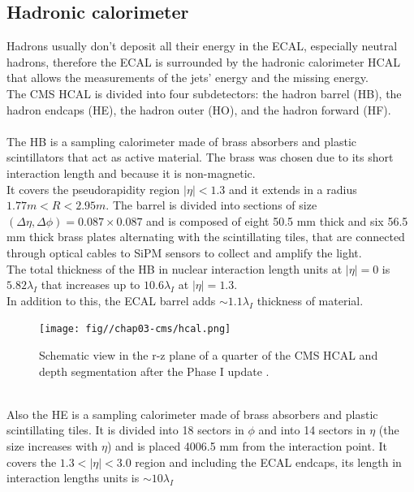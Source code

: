 \subsection{Hadronic calorimeter}
Hadrons usually don't deposit all their energy in the ECAL, especially neutral hadrons, therefore the ECAL is surrounded by the hadronic calorimeter HCAL that allows the measurements of the jets' energy and the missing energy.\\
The CMS HCAL \cite{Green1997TheReport,Anderson2012CMSCalorimeter} is divided into four subdetectors: the hadron barrel (HB), the hadron endcaps (HE), the hadron outer (HO), and the hadron forward (HF).\\
\\
The HB is a sampling calorimeter made of brass absorbers and plastic scintillators that act as active material. The brass was chosen due to its short interaction length and because it is non-magnetic.\\
It covers the pseudorapidity  region $|\eta|<1.3$ and it extends in a radius $1.77m<R<2.95m$. The barrel is divided into sections of size $(\Delta \eta, \Delta \phi)=0.087 \times 0.087$ and is composed of eight 50.5 mm thick and six 56.5 mm thick brass plates alternating with the scintillating tiles, that are connected through optical cables to SiPM sensors to collect and amplify the light.\\
The total thickness of the HB in nuclear interaction length units at $|\eta|=0$ is $5.82 \lambda_I$ that increases up to $10.6\lambda_I$ at $|\eta|=1.3$.\\
In addition to this, the ECAL barrel adds $\sim 1.1\lambda_I$ thickness of material.\\
\begin{figure}[h!]
    \centering
    \texttt{[image: fig//chap03-cms/hcal.png]}
    \caption{Schematic view in the r-z plane of a quarter of the CMS HCAL and depth segmentation after the Phase I update \cite{Anderson2012CMSCalorimeter}. }
    \label{fig:hcal}
\end{figure}
\\
Also the HE is a sampling calorimeter made of brass absorbers and plastic scintillating tiles. It is divided into 18 sectors in $\phi$ and into 14 sectors in $\eta$ (the size increases with $\eta$) and is placed 4006.5 mm from the interaction point. It covers the $1.3 < |\eta|<3.0$ region and including the ECAL endcaps, its length in interaction lengths units is $\sim10\lambda_I$\\
\\
